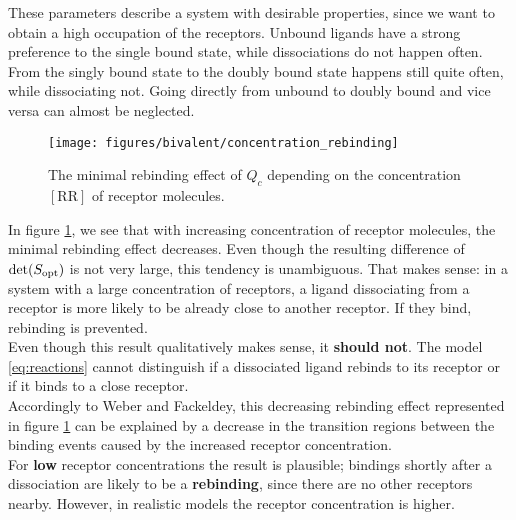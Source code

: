 These parameters describe a system with desirable properties, since we want to obtain a high occupation of the receptors. %
Unbound ligands have a strong preference to the single bound state, while dissociations do not happen often.
From the singly bound state to the doubly bound state happens still quite often, while dissociating not.
Going directly from unbound to doubly bound and vice versa can almost be neglected.

\begin{figure}[!ht]
	\label{fig:concentration_rebinding}
	\centering
	\texttt{[image: figures/bivalent/concentration\_rebinding]}
	\caption{The minimal rebinding effect of $Q_c$ depending on the concentration $\mathrm{[RR]}$ of receptor molecules.}
\end{figure}


In figure \ref{fig:concentration_rebinding}, we see that with increasing concentration of receptor molecules, the minimal rebinding effect decreases.
Even though the resulting difference of $\det(S_{\mathrm{opt}})$ is not very large, this tendency is unambiguous. 
That makes sense: in a system with a large concentration of receptors, a ligand dissociating from a receptor is more likely to be already close to another receptor. If they bind, rebinding is prevented.
\\

Even though this result qualitatively makes sense, it \textbf{should not}.
The model \eqref{eq:reactions} cannot distinguish if a dissociated ligand rebinds to its receptor or if it binds to a close receptor.
\\

Accordingly to Weber and Fackeldey\cite{weber2014}, this decreasing rebinding effect represented in figure \ref{fig:concentration_rebinding} can be explained by a decrease in the transition regions between the binding events caused by the increased receptor concentration.
\\

For \textbf{low} receptor concentrations the result is plausible; bindings shortly after a dissociation are likely to be a \textbf{rebinding}, since there are no other receptors nearby.
However, in realistic models the receptor concentration is higher.
\\

